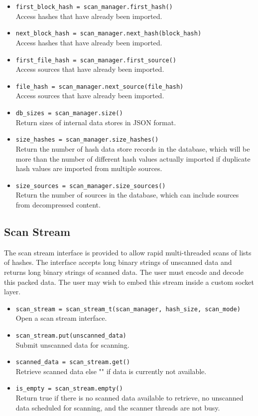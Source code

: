 \documentclass[11pt,fleqn]{article} %
\begin{document}
\begin{itemize}
\item \verb+first_block_hash = scan_manager.first_hash()+\\
Access hashes that have already been imported.
\item \verb+next_block_hash = scan_manager.next_hash(block_hash)+\\
Access hashes that have already been imported.
\item \verb+first_file_hash = scan_manager.first_source()+\\
Access sources that have already been imported.
\item \verb+file_hash = scan_manager.next_source(file_hash)+\\
Access sources that have already been imported.
\item \verb+db_sizes = scan_manager.size()+\\
Return sizes of internal data stores in JSON format.
\item \verb+size_hashes = scan_manager.size_hashes()+\\
Return the number of hash data store records in the database, which will be more than the number of different hash values actually imported if duplicate hash values are imported from multiple sources.
\item \verb+size_sources = scan_manager.size_sources()+\\
Return the number of sources in the database, which can include sources from decompressed content.
\end{itemize}

\subsection{Scan Stream}
The scan stream interface is provided to allow rapid multi-threaded scans of lists of hashes. The interface accepts long binary strings of unscanned data and returns long binary strings of scanned data. The user must encode and decode this packed data. The user may wish to embed this stream inside a custom socket layer.

\begin{itemize}
\item \verb+scan_stream = scan_stream_t(scan_manager, hash_size, scan_mode)+\\
Open a scan stream interface.
\item \verb+scan_stream.put(unscanned_data)+\\
Submit unscanned data for scanning.
\item \verb+scanned_data = scan_stream.get()+\\
Retrieve scanned data else "" if data is currently not available.
\item \verb+is_empty = scan_stream.empty()+\\
Return true if there is no scanned data available to retrieve, no unscanned data scheduled for scanning, and the scanner threads are not busy.
\end{itemize}
\end{document}
